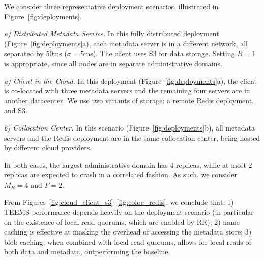 %
We consider three representative deployment scenarios, illustrated in
Figure~\ref{fig:deployments}.

\noindent \textit{a) Distributed Metadata Service.}
In this fully distributed deployment (Figure~\ref{fig:deployments}a),
each metadata server is in a different network, all separated by
$50$ms ($\sigma = 5$ms). The client uses S3 for data storage. Setting
$R = 1$ is appropriate, since all nodes are in separate
administrative domains.
\fi

\noindent \textit{a) Client in the Cloud.}
In this deployment (Figure~\ref{fig:deployments}a), the client is
co-located with three metadata servers and the remaining four servers
are in another datacenter.  We use two variants of storage: a
remote Redis deployment, and S3.

\noindent \textit{b) Collocation Center.}
In this scenario (Figure~\ref{fig:deployments}b), all metadata
servers and the Redis deployment are in the same collocation center, being hosted by different cloud
providers.

In both cases, the largest administrative domain has $4$
replicas, while at most $2$ replicas are expected to crash
in a correlated fashion. As such, we consider $M_R = 4$ and $F= 2$.

From Figures~\ref{fig:cloud_client_s3}--\ref{fig:coloc_redis}, we
conclude that: 1) \ac{TEEMS} performance depends heavily on the deployment
scenario (in particular on the existence of local read quorums, which
are enabled by \ac{RR}); 2) name caching is effective at masking
the overhead of accessing the metadata store; 3) blob caching, when
combined with local read quorums, allows for local reads of both data
and metadata, outperforming the baseline.

